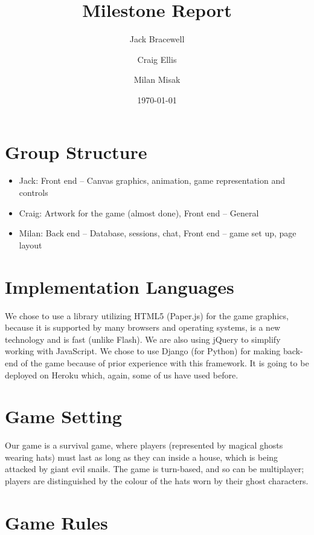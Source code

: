 \documentclass[a4wide, 11pt]{article}
\begin{document}
\title{Milestone Report}

\author{Jack Bracewell \and Craig Ellis \and Milan Misak}

\date{\today}         %

\maketitle            %

\section{Group Structure}

\begin{itemize}
	\item Jack: Front end -- Canvas graphics, animation, game representation and controls
	\item Craig: Artwork for the game (almost done), Front end -- General
	\item Milan: Back end -- Database, sessions, chat, Front end -- game set up, page layout
\end{itemize}


\section{Implementation Languages}

We chose to use a library utilizing HTML5 (Paper.js) for the game graphics, because it is supported by many browsers and operating systems, is a new technology and is fast (unlike Flash). We are also using jQuery to simplify working with JavaScript. We chose to use Django (for Python) for making back-end of the game because of prior experience with this framework. It is going to be deployed on Heroku which, again, some of us have used before.

\section{Game Setting}

Our game is a survival game, where players (represented by magical ghosts wearing hats) must last as long as they can inside a house, which is being attacked by giant evil snails. The game is turn-based, and so can be multiplayer; players are distinguished by the colour of the hats worn by their ghost characters.

\section{Game Rules}
\end{document}
